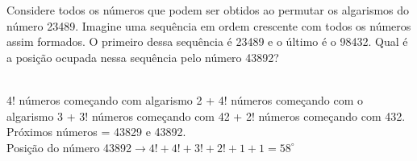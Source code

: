 \begin{ex}
Considere todos os números que podem ser obtidos ao permutar os algarismos do número 23489. Imagine uma sequência em ordem crescente com todos os números assim formados. O primeiro dessa sequência é 23489 e o último é o 98432. Qual é a posição ocupada nessa sequência pelo número 43892? 
  \begin{sol}
    \phantom{A} \\
    4! números começando com algarismo 2 + 4! números começando com o algarismo 3 + 3! números começando com 42 + 2! números começando com 432. Próximos números = 43829 e 43892.\\
    Posição do número 43892$\rightarrow4!+4!+3!+2!+1+1=58^{\circ}$
  \end{sol}
\end{ex}